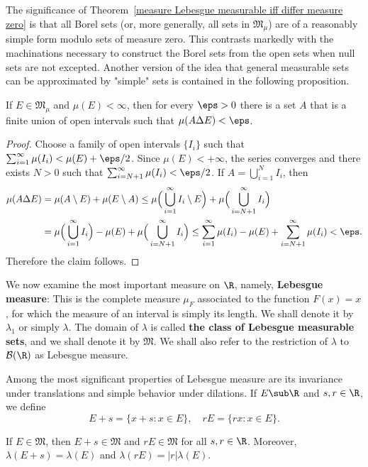 The significance of Theorem~\ref{measure Lebesgue measurable iff differ measure zero} is that all Borel sets (or, more generally, all sets in $\mathfrak{M}_\mu$) are of a reasonably simple form modulo sets of measure zero. This contrasts markedly with the machinations necessary to construct the Borel sets from the open sets when null sets are not excepted. Another version of the idea that general measurable sets can be approximated by "simple" sets is contained in the following proposition.
\begin{proposition}\label{measure Borel measurable iff symmetric diff}
If $E\in\mathfrak{M}_\mu$ and $\mu(E)<\infty$, then for every $\eps>0$ there is a set $A$ that is a finite union of open intervals such that $\mu(A\Delta E)<\eps$.
\end{proposition}
\begin{proof}
Choose a family of open intervals $\{I_i\}$ such that $\sum_{i=1}^{\infty}\mu(I_i)<\mu(E)+\eps/2$. Since $\mu(E)<+\infty$, the series converges and there exists $N>0$ such that $\sum_{i=N+1}^{\infty}\mu(I_i)<\eps/2$. If $A=\bigcup_{i=1}^{N}I_i$, then
\begin{align*}
\mu(A\Delta E)&=\mu(A\setminus E)+\mu(E\setminus A)\leq\mu\Big(\bigcup_{i=1}^{\infty}I_i\setminus E\Big)+\mu\Big(\bigcup_{i=N+1}^{\infty}I_i\Big)\\
&=\mu\Big(\bigcup_{i=1}^{\infty}I_i\Big)-\mu(E)+\mu\Big(\bigcup_{i=N+1}^{\infty}I_i\Big)\leq\sum_{i=1}^{\infty}\mu(I_i)-\mu(E)+\sum_{i=N+1}^{\infty}\mu(I_i)<\eps.
\end{align*}
Therefore the claim follows.
\end{proof}
We now examine the most important measure on $\R$, namely, \textbf{Lebesgue measure}: This is the complete measure $\mu_F$ associated to the function $F(x)=x$, for which the measure of an interval is simply its length. We shall denote it by $\lambda_1$ or simply $\lambda$. The domain of $\lambda$ is called \textbf{the class of Lebesgue measurable sets}, and we shall denote it by $\mathfrak{M}$. We shall also refer to the restriction of $\lambda$ to $\mathcal{B}(\R)$ as Lebesgue measure.\par
Among the most significant properties of Lebesgue measure are its invariance
under translations and simple behavior under dilations. If $E\sub\R$ and $s,r\in\R$, we define
\[E+s=\{x+s:x\in E\},\quad rE=\{rx:x\in E\}.\]
\begin{theorem}\label{measure Lebesgue invariance R^1}
If $E\in\mathfrak{M}$, then $E+s\in\mathfrak{M}$ and $rE\in\mathfrak{M}$ for all $s,r\in\R$. Moreover, $\lambda(E+s)=\lambda(E)$ and $\lambda(rE)=|r|\lambda(E)$.
\end{theorem}
